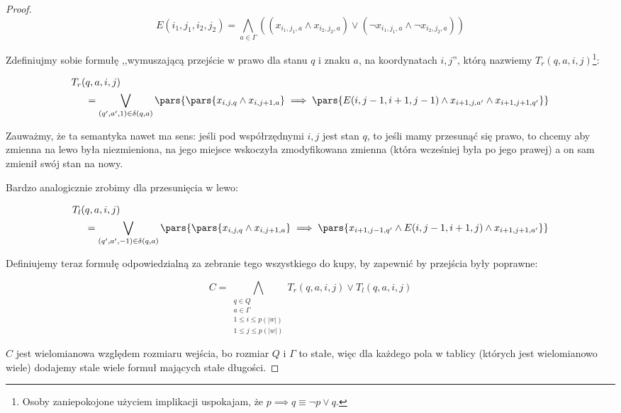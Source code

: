 \begin{proof}
        \[ 
            E(i_1, j_1, i_2, j_2) = \bigwedge_{a \in \Gamma} ((x_{i_1, j_1, a} \land x_{i_2, j_2, a}) \lor (\neg x_{i_1, j_1, a} \land \neg x_{i_2, j_2, a}) )
        \]
        
        Zdefiniujmy sobie formułę ,,wymuszającą przejście w prawo dla stanu \(q\) i znaku \(a\), na koordynatach \(i, j\)'', którą nazwiemy \(T_r(q, a, i, j)\)\footnote{Osoby zaniepokojone użyciem implikacji uspokajam, że \(p \implies q \equiv \neg p \lor q\).}:
        
        \[
            \begin{split}
            T_r(&q,a, i, j)\\
                &= \bigvee_{(q', a', 1) \in \delta(q,a)} \pars{\pars{x_{i,j,q} \land x_{i, j + 1, a}} \implies \pars{E(i, j-1, i+1, j-1) \land x_{i+1, j, a'} \land x_{i+1, j+1, q'}}}
            \end{split}
        \]
        
        Zauważmy, że ta semantyka nawet ma sens: jeśli pod współrzędnymi \(i,j\) jest stan \(q\), to jeśli mamy przesunąć się prawo, to chcemy aby zmienna na lewo była niezmieniona, na jego miejsce wskoczyła zmodyfikowana zmienna (która wcześniej była po jego prawej) a on sam zmienił swój stan na nowy. 
        
        Bardzo analogicznie zrobimy dla przesunięcia w lewo:
        
        \[
            \begin{split}
                T_l(&q, a , i, j)\\
                    &= \bigvee_{(q', a', -1) \in \delta(q,a)} \pars{\pars{x_{i,j,q} \land x_{i, j + 1, a}} \implies \pars{x_{i+1, j-1, q'} \land E(i, j-1, i+1, j) \land x_{i + 1,j + 1,a'}}}
            \end{split}
        \]
    
        
        Definiujemy teraz formułę odpowiedzialną za zebranie tego wszystkiego do kupy, by zapewnić by przejścia były poprawne:
        
        \[ 
            C = \bigwedge_{\substack{q \in Q \\ a \in \Gamma \\ 1 \leq i \leq p(|w|) \\ 1 \leq j \leq p(|w|)}} T_r(q,a,i,j) \lor T_l(q,a,i,j) 
        \]
        
        \(C\) jest wielomianowa względem rozmiaru wejścia, bo rozmiar \(Q\) i \(\Gamma\) to stałe, więc dla każdego pola w tablicy (których jest wielomianowo wiele) dodajemy stale wiele formuł mających stałe długości. 
        

\end{proof}

